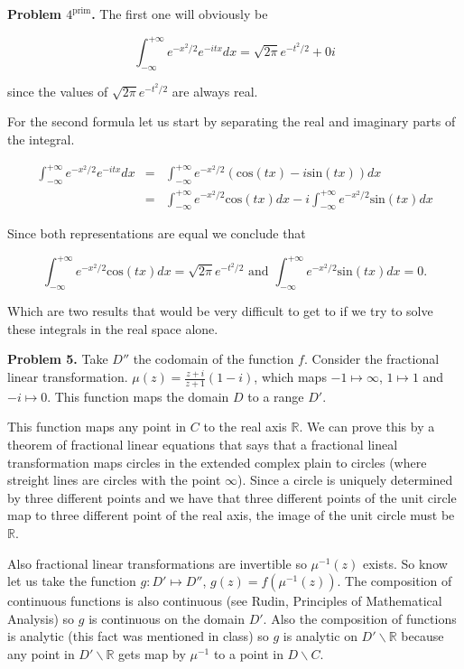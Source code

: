 \documentclass[letterpaper,twoside,11pt]{article}
\begin{document}
\begin{enumerate}[a)]
\newpage
\textbf{Problem $4^{\text{prim}}$.} 
The first one will obviously be

\begin{equation}
\int_{-\infty}^{+\infty} e^{-x^2/2}e^{-itx}dx=\sqrt{2\pi}e^{-t^2/2}+0i\nonumber
\end{equation}

since the values of $\sqrt{2\pi}e^{-t^2/2}$ are always real.

For the second formula let us start by separating the real and imaginary parts of the integral.

\begin{eqnarray}
\int_{-\infty}^{+\infty} e^{-x^2/2}e^{-itx}dx&=&\int_{-\infty}^{+\infty} e^{-x^2/2}(\text{cos}(tx)-i\text{sin}(tx))dx\nonumber
\\ &=&\int_{-\infty}^{+\infty} e^{-x^2/2}\text{cos}(tx)dx-i\int_{-\infty}^{+\infty} e^{-x^2/2}\text{sin}(tx)dx\nonumber
\end{eqnarray}

Since both representations are equal we conclude that

\begin{equation}
\int_{-\infty}^{+\infty} e^{-x^2/2}\text{cos}(tx)dx= \sqrt{2\pi}e^{-t^2/2} \text{ and } \int_{-\infty}^{+\infty} e^{-x^2/2}\text{sin}(tx)dx=0.\nonumber
\end{equation}

Which are two results that would be very difficult to get to if we try to solve these integrals in the real space alone.

\newpage
\textbf{Problem 5.}
Take $D''$ the codomain of the function $f$. Consider the fractional linear transformation. $\mu(z)=\frac{z+i}{z+1}(1-i)$, which maps $-1 \mapsto \infty$, $1 \mapsto 1$ and $-i\mapsto 0$. This function maps the domain $D$ to a range $D'$.

This function maps any point in $C$ to the real axis $\mathbb{R}$. We can prove this by a theorem of fractional linear equations that says that a fractional lineal transformation maps circles in the extended complex plain to circles (where streight lines are circles with the point $\infty$). Since a circle is uniquely determined by three different points and we have that three different points of the unit circle map to three different point of the real axis, the image of the unit circle must be $\mathbb{R}$.

Also fractional linear transformations are invertible so $\mu^{-1}(z)$ exists. So know let us take the function $g: D'\longmapsto D''$, $g(z) =f(\mu^{-1}(z))$. The composition of continuous functions is also continuous (see Rudin, Principles of Mathematical Analysis) so $g$ is continuous on the domain $D'$. Also the composition of functions is analytic (this fact was mentioned in class) so $g$ is analytic on $D'\backslash\mathbb{R}$ because any point in $D'\backslash\mathbb{R}$ gets map by $\mu^{-1}$ to a point in $D\backslash C$.


\end{enumerate}
\end{document}
